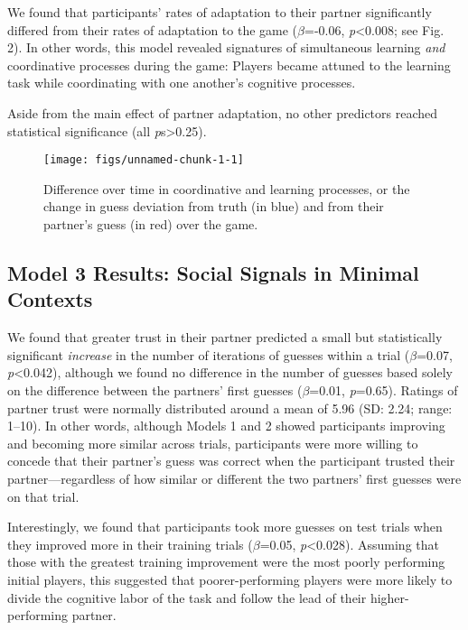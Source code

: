 \documentclass[10pt, letterpaper]{article}
\newenvironment{CodeChunk}{}{}
\begin{document}
We found that participants' rates of adaptation to their partner
significantly differed from their rates of adaptation to the game
(\emph{\(\beta\)}=-0.06, \emph{p}\textless{}0.008; see Fig. 2). In other
words, this model revealed signatures of simultaneous learning
\emph{and} coordinative processes during the game: Players became
attuned to the learning task while coordinating with one another's
cognitive processes.

Aside from the main effect of partner adaptation, no other predictors
reached statistical significance (all \emph{p}s\textgreater{}0.25).

\begin{CodeChunk}
\begin{figure}[H]

\texttt{[image: figs/unnamed-chunk-1-1]} \hfill{}

\caption[Difference over time in coordinative and learning processes, or the change in guess deviation from truth (in blue) and from their partner's guess (in red) over the game]{Difference over time in coordinative and learning processes, or the change in guess deviation from truth (in blue) and from their partner's guess (in red) over the game.}\label{fig:unnamed-chunk-1}
\end{figure}
\end{CodeChunk}

\subsection{Model 3 Results: Social Signals in Minimal
Contexts}\label{model-3-results-social-signals-in-minimal-contexts}

We found that greater trust in their partner predicted a small but
statistically significant \emph{increase} in the number of iterations of
guesses within a trial (\emph{\(\beta\)}=0.07,
\emph{p}\textless{}0.042), although we found no difference in the number
of guesses based solely on the difference between the partners' first
guesses (\emph{\(\beta\)}=0.01, \emph{p}=0.65). Ratings of partner trust
were normally distributed around a mean of 5.96 (SD: 2.24; range:
1--10). In other words, although Models 1 and 2 showed participants
improving and becoming more similar across trials, participants were
more willing to concede that their partner's guess was correct when the
participant trusted their partner---regardless of how similar or
different the two partners' first guesses were on that trial.

Interestingly, we found that participants took more guesses on test
trials when they improved more in their training trials
(\emph{\(\beta\)}=0.05, \emph{p}\textless{}0.028). Assuming that those
with the greatest training improvement were the most poorly performing
initial players, this suggested that poorer-performing players were more
likely to divide the cognitive labor of the task and follow the lead of
their higher-performing partner.
\end{document}

